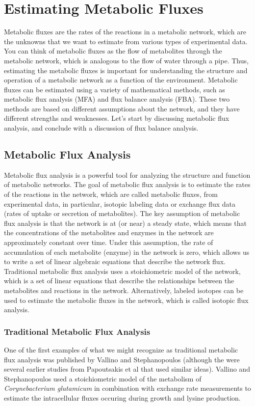 \documentclass{article}[12pt]
\begin{document}
\section{Estimating Metabolic Fluxes}
Metabolic fluxes are the rates of the reactions in a metabolic network, which are the unknowns that we want to estimate from various types of experimental data.
You can think of metabolic fluxes as the flow of metabolites through the metabolic network, which is analogous to the flow of water through a pipe.
Thus, estimating the metabolic fluxes is important for understanding the structure and operation of a metabolic network as a function of the environment.
Metabolic fluxes can be estimated using a variety of mathematical methods, such as metabolic flux analysis (MFA) and flux balance analysis (FBA).
These two methods are based on different assumptions about the network, and they have different strengths and weaknesses.
Let's start by discussing metabolic flux analysis, and conclude with a discussion of flux balance analysis.

\subsection{Metabolic Flux Analysis}
Metabolic flux analysis is a powerful tool for analyzing the structure and function of metabolic networks.
The goal of metabolic flux analysis is to estimate the rates of the reactions in the network, which are called metabolic fluxes, from experimental data, in particular, isotopic labeling data or exchange flux data (rates of uptake or secretion of metabolites).
The key assumption of metabolic flux analysis is that the network is at (or near) a steady state, which means that the concentrations of the metabolites and enzymes in the network are approximately constant over time.
Under this assumption, the rate of accumulation of each metabolite (enzyme) in the network is zero, which allows us to write a set of linear algebraic equations that describe the network flux.
Traditional metabolic flux analysis uses a stoichiometric model of the network, which is a set of linear equations that describe the relationships between the metabolites and reactions in the network.
Alternatively, labeled isotopes can be used to estimate the metabolic fluxes in the network, which is called isotopic flux analysis.

\subsubsection*{Traditional Metabolic Flux Analysis}
One of the first examples of what we might recognize as traditional metabolic flux analysis was published by Vallino and Stephanopoulos \cite{Vallino:1993aa}
(although the were several earlier studies from Papoutsakis et al \cite{Papoutsakis:1985ab, Papoutsakis:1985aa} that used similar ideas).
Vallino and Stephanopoulos used a stoichiometric model of the metabolism of \textit{Corynebacterium glutamicum} in combination with exchange rate measurements to estimate the intracellular fluxes occuring during growth and lysine production.
\end{document}
